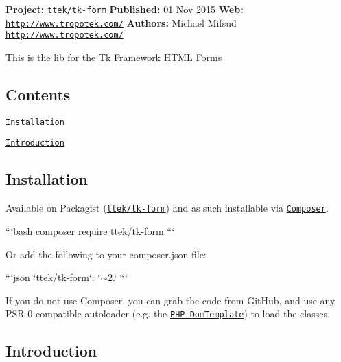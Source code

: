 {\bfseries Project\+:} \href{http://packagist.org/packages/ttek/tk-form}{\tt ttek/tk-\/form} {\bfseries Published\+:} 01 Nov 2015 {\bfseries Web\+:} \href{http://www.tropotek.com/}{\tt http\+://www.\+tropotek.\+com/} {\bfseries Authors\+:} Michael Mifsud \href{http://www.tropotek.com/}{\tt http\+://www.\+tropotek.\+com/}

This is the lib for the Tk Framework H\+T\+M\+L Forms

\subsection*{Contents}


\begin{DoxyItemize}
\item \href{#installation}{\tt Installation}
\item \href{#introduction}{\tt Introduction}
\end{DoxyItemize}

\subsection*{Installation}

Available on Packagist (\href{http://packagist.org/packages/ttek/tk-form}{\tt ttek/tk-\/form}) and as such installable via \href{http://getcomposer.org/}{\tt Composer}.

```bash composer require ttek/tk-\/form ```

Or add the following to your composer.\+json file\+:

```json \char`\"{}ttek/tk-\/form\char`\"{}\+: \char`\"{}$\sim$2.\char`\"{} ```

If you do not use Composer, you can grab the code from Git\+Hub, and use any P\+S\+R-\/0 compatible autoloader (e.\+g. the \href{https://github.com/tropotek/tk-form}{\tt P\+H\+P Dom\+Template}) to load the classes.

\subsection*{Introduction}